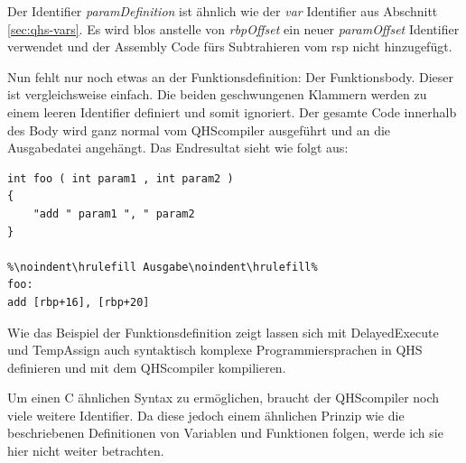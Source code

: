 Der Identifier \textit{paramDefinition} ist ähnlich wie der \textit{var} Identifier aus Abschnitt \ref{sec:qhs-vars}.
Es wird blos anstelle von \textit{rbpOffset} ein neuer \textit{paramOffset} Identifier verwendet und der Assembly Code fürs Subtrahieren vom rsp nicht hinzugefügt.

Nun fehlt nur noch etwas an der Funktionsdefinition: Der Funktionsbody. Dieser ist vergleichsweise einfach. Die beiden geschwungenen Klammern werden zu einem leeren Identifier definiert und somit ignoriert.
Der gesamte Code innerhalb des Body wird ganz normal vom QHScompiler ausgeführt und an die Ausgabedatei angehängt. Das Endresultat sieht wie folgt aus:

\begin{lstlisting}[language=QHS, caption=Finale Definition einer Funktion in QHS]
int foo ( int param1 , int param2 )
{
    "add " param1 ", " param2
}

%\noindent\hrulefill Ausgabe\noindent\hrulefill%
foo:
add [rbp+16], [rbp+20]
\end{lstlisting}

Wie das Beispiel der Funktionsdefinition zeigt lassen sich mit DelayedExecute und TempAssign auch syntaktisch komplexe Programmiersprachen in QHS definieren und mit dem QHScompiler kompilieren.

Um einen C ähnlichen Syntax zu ermöglichen, braucht der QHScompiler noch viele weitere Identifier.
Da diese jedoch einem ähnlichen Prinzip wie die beschriebenen Definitionen von Variablen und Funktionen folgen, werde ich sie hier nicht weiter betrachten.


    






